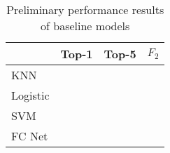 \documentclass[10pt,twocolumn,letterpaper]{article}
\begin{document}
\begin{table}
   \begin{center}
   \begin{tabular}{|l|c|c|c|}
   \hline
   & Top-1 & Top-5 & $F_2$ \\
   \hline\hline
   KNN &&& \\
   Logistic &&& \\
   SVM &&& \\
   FC Net &&&\\
   \hline
   \end{tabular}
   \end{center}
   \caption{Preliminary performance results of baseline models}
\end{table}



{\small


}
\end{document}
